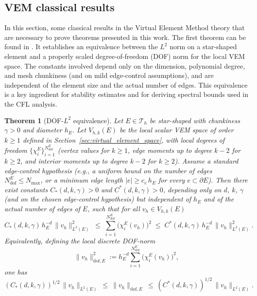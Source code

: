 \documentclass{article}
\newtheorem{theo}{Theorem}[section]
\begin{document}
\subsection{VEM classical results}
In this section, some classical results in the Virtual Element Method theory that are necessary to prove theorems presented in this work. The first theorem can be found in \cite{chen2018error}. It establishes an equivalence between the $L^2$ norm on a star-shaped element and a properly scaled degree-of-freedom (DOF) norm for the local VEM space. The constants involved depend only on the dimension, polynomial degree, and mesh chunkiness (and on mild edge-control assumptions), and are independent of the element size and the actual number of edges. This equivalence is a key ingredient for stability estimates and for deriving spectral bounds used in the CFL analysis.
\begin{theo}[DOF-$L^2$ equivalence]\label{theo:l2_equivalence}
    Let $E\in\mathcal{T}_h$ be star-shaped with chunkiness $\gamma>0$ and diameter $h_E$. Let $V_{h,k}(E)$ be the local scalar VEM space of order $k\ge 1$ defined in Section~\ref{sec:virtual_element_space}, with local degrees of freedom $\{\chi_i^E\}_{i=1}^{N^E_{\mathrm{dof}}}$ (vertex values for $k\ge 1$, edge moments up to degree $k-2$ for $k\ge 2$, and interior moments up to degree $k-2$ for $k\ge 2$). Assume a standard edge-control hypothesis (e.g., a uniform bound on the number of edges $N^E_{\mathrm{dof}}\le N_{\max}$, or a minimum edge length $|e|\ge c_e\,h_E$ for every $e\subset\partial E$). Then there exist constants $C_{*}(d,k,\gamma)>0$ and $C^{*}(d,k,\gamma)>0$, depending only on $d$, $k$, $\gamma$ (and on the chosen edge-control hypothesis) but independent of $h_E$ and of the actual number of edges of $E$, such that for all $v_h\in V_{h,k}(E)$
    \begin{equation}
        \nonumber
        C_{*}(d,k,\gamma)\, h_E^{-d}\, \|v_h\|^2_{L^2(E)}\;\le\; \sum_{i=1}^{N^E_{\mathrm{dof}}} \big(\chi_i^E(v_h)\big)^2\;\le\; C^{*}(d,k,\gamma)\, h_E^{-d}\, \|v_h\|^2_{L^2(E)}.
    \end{equation}
    Equivalently, defining the local discrete DOF-norm
    \begin{equation}
        \nonumber
        \|v_h\|^2_{\mathrm{dof},E} := h_E^{-d}\sum_{i=1}^{N^E_{\mathrm{dof}}} \big(\chi_i^E(v_h)\big)^2,
    \end{equation}
    one has
    \begin{equation}
        \nonumber
        (C_{*}(d,k,\gamma))^{1/2}\,\|v_h\|_{L^2(E)}\ \le\ \|v_h\|_{\mathrm{dof},E}\ \le\ (C^{*}(d,k,\gamma))^{1/2}\,\|v_h\|_{L^2(E)}.
    \end{equation}
\end{theo}
\end{document}

